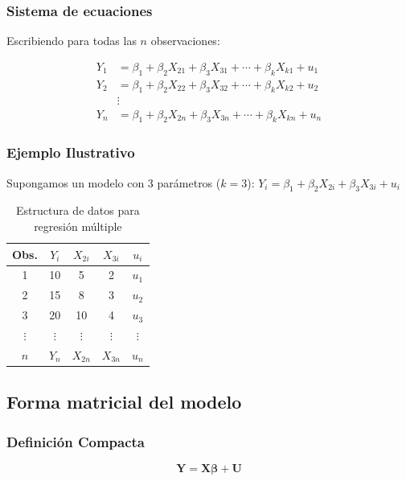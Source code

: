 \documentclass[11pt,a4paper]{article}
\begin{document}
\subsubsection*{Sistema de ecuaciones}
 
Escribiendo para todas las $n$ observaciones:
 
\begin{align*}
Y_1 &= \beta_1 + \beta_2 X_{21} + \beta_3 X_{31} + \cdots + \beta_k X_{k1} + u_1 \\
Y_2 &= \beta_1 + \beta_2 X_{22} + \beta_3 X_{32} + \cdots + \beta_k X_{k2} + u_2 \\
&\vdots \\
Y_n &= \beta_1 + \beta_2 X_{2n} + \beta_3 X_{3n} + \cdots + \beta_k X_{kn} + u_n
\end{align*}
 
\subsubsection*{Ejemplo Ilustrativo}
 
Supongamos un modelo con 3 parámetros ($k=3$): $Y_i = \beta_1 + \beta_2 X_{2i} + \beta_3 X_{3i} + u_i$
 
\begin{table}[H]
\centering
\small
\begin{tabular}{|c|c|c|c|c|}
\hline
\textbf{Obs.} & $Y_i$ & $X_{2i}$ & $X_{3i}$ & $u_i$ \\
\hline
1 & 10 & 5 & 2 & $u_1$ \\
2 & 15 & 8 & 3 & $u_2$ \\
3 & 20 & 10 & 4 & $u_3$ \\
$\vdots$ & $\vdots$ & $\vdots$ & $\vdots$ & $\vdots$ \\
$n$ & $Y_n$ & $X_{2n}$ & $X_{3n}$ & $u_n$ \\
\hline
\end{tabular}
\caption{Estructura de datos para regresión múltiple}
\label{tab:datos_multiples}
\end{table}
 
\subsection{Forma matricial del modelo}
 
\subsubsection*{Definición Compacta}
 
\begin{resultado}
\[
\boxed{\mathbf{Y} = \mathbf{X}\boldsymbol{\beta} + \mathbf{U}}
\]
\end{resultado}
 
\end{document}

